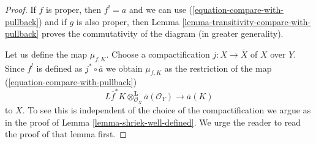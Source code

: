 \documentclass[10pt,a4paper]{amsart}
\theoremstyle{plain}
\theoremstyle{definition}
\theoremstyle{remark}
\numberwithin{equation}{subsection}
\begin{document}
\begin{proof}
If $f$ is proper, then $f^! = a$ and we can use
(\ref{equation-compare-with-pullback}) and if $g$ is also proper,
then Lemma \ref{lemma-transitivity-compare-with-pullback} proves
the commutativity of the diagram (in greater generality).

\medskip\noindent
Let us define the map $\mu_{f, K}$. Choose a compactification
$j : X \to \overline{X}$ of $X$ over $Y$. Since $f^!$ is defined
as $j^* \circ \overline{a}$ we obtain $\mu_{f, K}$ as the restriction
of the map (\ref{equation-compare-with-pullback})
$$
L\overline{f}^*K \otimes_{\mathcal{O}_{\overline{X}}}^\mathbf{L}
\overline{a}(\mathcal{O}_Y)
\longrightarrow
\overline{a}(K)
$$
to $X$. To see this is independent of the choice of the compactification
we argue as in the proof of Lemma \ref{lemma-shriek-well-defined}.
We urge the reader to read the proof of that lemma first.


\end{proof}
\end{document}
